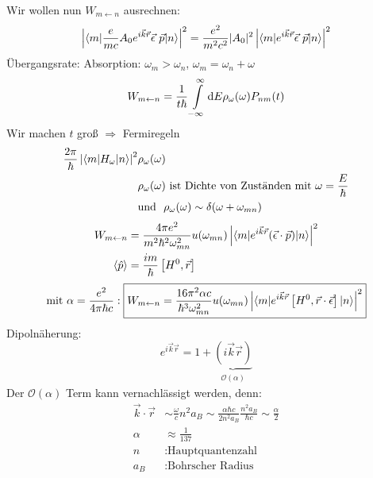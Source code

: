 	Wir wollen nun $W_{m \leftarrow n}$ ausrechnen:
		\begin{align*}
			\left|\braket{m | \frac{e}{m c} A_0 e^{i \vec{k} \vec{r}} \vec{\epsilon}~\vec{p} |n}\right|^2
			= \frac{e^2}{m^2 c^2} |A_0|^2 \left| \braket{m | e^{i \vec{k} \vec{r}} \vec{\epsilon}~\vec{p} | n}\right|^2
		\end{align*}
	Übergangsrate: Absorption: $\omega_m > \omega_n$, $\omega_m = \omega_n + \omega$
		\begin{equation*}
			W_{m \leftarrow n} = 
			\frac{1}{t \hbar} \int \limits_{-\infty}^{\infty} 
			\mathrm{d} E \rho_\omega (\omega) P_{nm} (t)
		\end{equation*}
	Wir machen $t$ groß $\Rightarrow$ Fermiregeln
		\begin{align*}
			\frac{2 \pi}{\hbar} \left|\braket{m | H_\omega | n}\right|^2 &\rho_\omega (\omega) \\
			&\rho_\omega (\omega) \text{~ist Dichte von Zuständen mit~} \omega = \frac{E}{\hbar} \\
			&\text{und~ }\rho_\omega (\omega)\sim \delta (\omega + \omega_{mn})
		\end{align*}
		\begin{align*}
			W_{m \leftarrow n} &= 
			\frac{4 \pi e^2}{m^2 \hbar^2 \omega_{mn}^2} u(\omega_{mn}) 
			\left|\braket{m | e^{i \vec{k} \vec{r}} (\vec{\epsilon} \cdot \vec{p}) | n}\right|^2 \\
			\langle {\hat{p}} \rangle &= \frac{i m}{\hbar} \left[H^0 , \vec{r} \right] 
		\end{align*}
		\begin{align*}
			\text{mit~}\alpha = \frac{e^2}{4 \pi \hbar c} :
			\boxed{W_{m \leftarrow n} = \frac{16 \pi^2 \alpha c}{\hbar^3 \omega_{mn}^2} 
				u (\omega_{mn}) \left|\braket{m | e^{i \vec{k} \vec{r}} \left[H^0 , \vec{r} \cdot \vec{\epsilon}\right] | n}\right|^2
			}
		\end{align*}
	Dipolnäherung: 
		\begin{equation*}
			e^{i \vec{k} \vec{r}} = 1 + 
			\underbrace{(i \vec{k} \vec{r})}_{\substack{\mathcal{O}(\alpha)}}
		\end{equation*}
	Der $\mathcal{O}(\alpha)$ Term kann vernachlässigt werden, denn:
		\begin{align*}
			\vec{k} \cdot \vec{r} 
			&\sim \frac{\omega}{c} n^2 a_B
			\sim \frac{\alpha \hbar c}{2 n^2 a_B} \frac{n^2 a_B}{\hbar c}
			\sim \frac{\alpha}{2} \\
			\alpha &\approx \frac{1}{137} \\
			n &: \text{Hauptquantenzahl} \\	
			a_B &: \text{Bohrscher Radius}		
		\end{align*}

